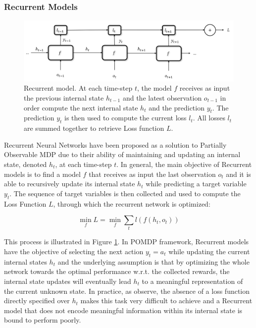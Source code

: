             \subsubsection{Recurrent Models}
                
                \begin{figure}[t]
                    \centering
                    \includegraphics[width=15cm, keepaspectratio]{images/pomdp/pomdp_rnn.png}
                    \caption{Recurrent model. At each time-step $t$, the model $f$ receives as input the previous internal state $h_{t-1}$ and the latest observation $o_{t-1}$ in order compute the next internal state $h_{t}$ and the prediction $y_{t}$. The prediction $y_t$ is then used to compute the current loss $l_t$. All losses $l_t$ are summed together to retrieve Loss function $L$.}
                    \label{fig:pomdp_rnn}
                \end{figure}
                
                Recurrent Neural Networks have been proposed as a solution to Partially Observable MDP due to their ability of maintaining and updating an internal state, denoted $h_t$, at each time-step $t$. In general, the main objective of Recurrent models is to find a model $f$ that receives as input the last observation $o_t$ and it is able to recursively update its internal state $h_t$ while predicting a target variable $y_t$. The sequence of target variables is then collected and used to compute the Loss Function $L$, through which the recurrent network is optimized:
                
                \[ \min_{f} L = \min_{f} \sum_{t} l(f(h_t, o_t)) \]
                
                \noindent
                This process is illustrated in Figure \ref{fig:pomdp_rnn}. In POMDP framework, Recurrent models have the objective of selecting the next action $y_t = a_t$ while updating the current internal states $h_t$ and the underlying assumption is that by optimizing the whole network towards the optimal performance w.r.t. the collected rewards, the internal state updates will eventually lead $h_t$ to a meaningful representation of the current unknown state. In practice, as  observe, the absence of a loss function directly specified over $h_t$ makes this task very difficult to achieve and a Recurrent model that does not encode meaningful information within its internal state is bound to perform poorly.
                
